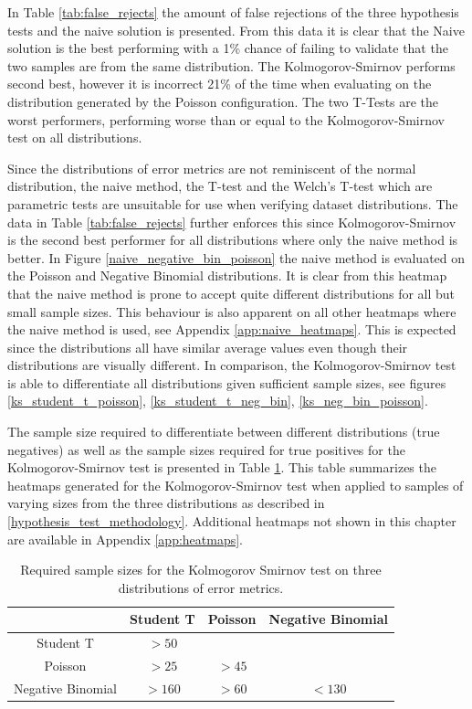 In Table \ref{tab:false_rejects} the amount of false rejections of the three hypothesis tests and the naive solution is presented. From this data it is clear that the Naive solution is the best performing with a 1\% chance of failing to validate that the two samples are from the same distribution. The Kolmogorov-Smirnov performs second best, however it is incorrect 21\% of the time when evaluating on the distribution generated by the Poisson configuration. The two T-Tests are the worst performers, performing worse than or equal to the Kolmogorov-Smirnov test on all distributions.

Since the distributions of error metrics are not reminiscent of the normal distribution, the naive method, the T-test and the Welch's T-test which are parametric tests are unsuitable for use when verifying dataset distributions. The data in Table \ref{tab:false_rejects} further enforces this since Kolmogorov-Smirnov is the second best performer for all distributions where only the naive method is better. In Figure \ref{naive_negative_bin_poisson} the naive method is evaluated on the Poisson and Negative Binomial distributions. It is clear from this heatmap that the naive method is prone to accept quite different distributions for all but small sample sizes. This behaviour is also apparent on all other heatmaps where the naive method is used, see Appendix \ref{app:naive_heatmaps}. This is expected since the distributions all have similar average values even though their distributions are visually different. In comparison, the Kolmogorov-Smirnov test is able to differentiate all distributions given sufficient sample sizes, see figures \ref{ks_student_t_poisson}, \ref{ks_student_t_neg_bin}, \ref{ks_neg_bin_poisson}.

The sample size required to differentiate between different distributions (true negatives) as well as the sample sizes required for true positives for the Kolmogorov-Smirnov test is presented in Table \ref{tab:required_sample_sizes}. This table summarizes the heatmaps generated for the Kolmogorov-Smirnov test when applied to samples of varying sizes from the three distributions as described in \ref{hypothesis_test_methodology}. Additional heatmaps not shown in this chapter are available in Appendix \ref{app:heatmaps}.


\begin{table}[htp]
  \centering
  \begin{tabular}{cccc}
                      & Student T & Poisson & Negative Binomial \\
    \hline
    Student T         & \(>50\)   &         &                   \\
    \hline
    Poisson           & \(>25\)   & \(>45\) &                   \\
    \hline
    Negative Binomial & \(>160\)  & \(>60\) & \(<130\)          \\
  \end{tabular}
  \caption{Required sample sizes for the Kolmogorov Smirnov test on three distributions of error metrics.}
  \label{tab:required_sample_sizes}
\end{table}

